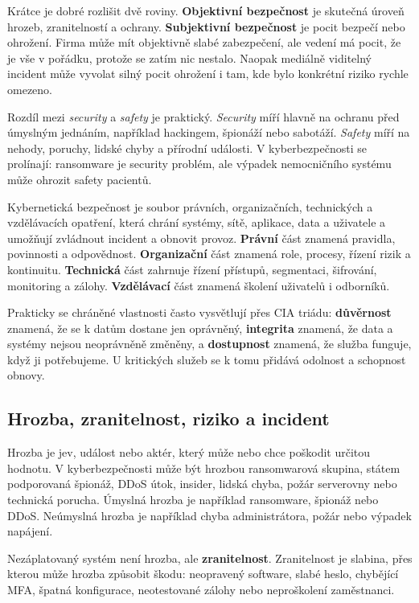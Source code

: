 Krátce je dobré rozlišit dvě roviny. \textbf{Objektivní bezpečnost} je skutečná úroveň hrozeb, zranitelností a ochrany. \textbf{Subjektivní bezpečnost} je pocit bezpečí nebo ohrožení. Firma může mít objektivně slabé zabezpečení, ale vedení má pocit, že je vše v pořádku, protože se zatím nic nestalo. Naopak mediálně viditelný incident může vyvolat silný pocit ohrožení i tam, kde bylo konkrétní riziko rychle omezeno.

Rozdíl mezi \emph{security} a \emph{safety} je praktický. \emph{Security} míří hlavně na ochranu před úmyslným jednáním, například hackingem, špionáží nebo sabotáží. \emph{Safety} míří na nehody, poruchy, lidské chyby a přírodní události. V kyberbezpečnosti se prolínají: ransomware je security problém, ale výpadek nemocničního systému může ohrozit safety pacientů.

Kybernetická bezpečnost je soubor právních, organizačních, technických a vzdělávacích opatření, která chrání systémy, sítě, aplikace, data a uživatele a umožňují zvládnout incident a obnovit provoz. \textbf{Právní} část znamená pravidla, povinnosti a odpovědnost. \textbf{Organizační} část znamená role, procesy, řízení rizik a kontinuitu. \textbf{Technická} část zahrnuje řízení přístupů, segmentaci, šifrování, monitoring a zálohy. \textbf{Vzdělávací} část znamená školení uživatelů i odborníků.

Prakticky se chráněné vlastnosti často vysvětlují přes CIA triádu: \textbf{důvěrnost} znamená, že se k datům dostane jen oprávněný, \textbf{integrita} znamená, že data a systémy nejsou neoprávněně změněny, a \textbf{dostupnost} znamená, že služba funguje, když ji potřebujeme. U kritických služeb se k tomu přidává odolnost a schopnost obnovy.

\subsection*{Hrozba, zranitelnost, riziko a incident}
Hrozba je jev, událost nebo aktér, který může nebo chce poškodit určitou hodnotu. V kyberbezpečnosti může být hrozbou ransomwarová skupina, státem podporovaná špionáž, DDoS útok, insider, lidská chyba, požár serverovny nebo technická porucha. Úmyslná hrozba je například ransomware, špionáž nebo DDoS. Neúmyslná hrozba je například chyba administrátora, požár nebo výpadek napájení.

Nezáplatovaný systém není hrozba, ale \textbf{zranitelnost}. Zranitelnost je slabina, přes kterou může hrozba způsobit škodu: neopravený software, slabé heslo, chybějící MFA, špatná konfigurace, neotestované zálohy nebo neproškolení zaměstnanci.

